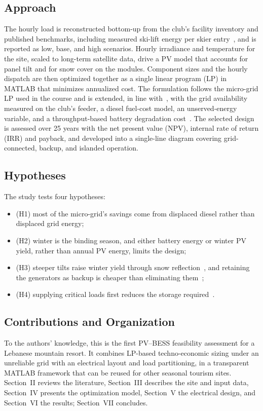 \subsection{Approach}
The hourly load is reconstructed bottom-up from the club's facility inventory and published benchmarks, including measured ski-lift energy per skier entry~\cite{viesi2023}, and is reported as low, base, and high scenarios. Hourly irradiance and temperature for the site, scaled to long-term satellite data, drive a PV model that accounts for panel tilt and for snow cover on the modules. Component sizes and the hourly dispatch are then optimized together as a single linear program (LP) in MATLAB that minimizes annualized cost. The formulation follows the micro-grid LP used in the course and is extended, in line with~\cite{chedid2020,leon2023}, with the grid availability measured on the club's feeder, a diesel fuel-cost model, an unserved-energy variable, and a throughput-based battery degradation cost~\cite{seger2023}. The selected design is assessed over 25 years with the net present value (NPV), internal rate of return (IRR) and payback, and developed into a single-line diagram covering grid-connected, backup, and islanded operation.

\subsection{Hypotheses}
The study tests four hypotheses:
\begin{itemize}
    \item (H1) most of the micro-grid's savings come from displaced diesel rather than displaced grid energy;
    \item (H2) winter is the binding season, and either battery energy or winter PV yield, rather than annual PV energy, limits the design;
    \item (H3) steeper tilts raise winter yield through snow reflection~\cite{kahl2019}, and retaining the generators as backup is cheaper than eliminating them~\cite{chedid2020};
    \item (H4) supplying critical loads first reduces the storage required~\cite{eissa2026}.
\end{itemize}

\subsection{Contributions and Organization}
To the authors' knowledge, this is the first PV--BESS feasibility assessment for a Lebanese mountain resort. It combines LP-based techno-economic sizing under an unreliable grid with an electrical layout and load partitioning, in a transparent MATLAB framework that can be reused for other seasonal tourism sites. Section~II reviews the literature, Section~III describes the site and input data, Section~IV presents the optimization model, Section~V the electrical design, and Section~VI the results; Section~VII concludes.
